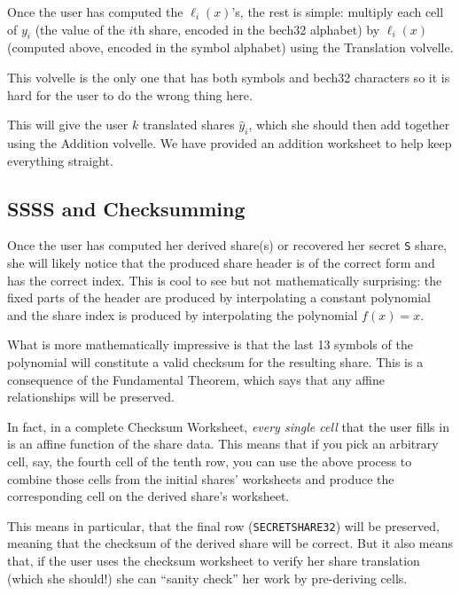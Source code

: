 \documentclass[letterpaper]{article}
\theoremstyle{xxx}
\theoremstyle{evil}
\theoremstyle{yyy}
\theoremstyle{plain}
\theoremstyle{zzz}
\newcommand{\vc}[1]{\texttt{#1}} %
\begin{document}
Once the user has computed the $\ell_i(x)$'s, the rest is simple: multiply each
cell of $y_i$ (the value of the $i$th share, encoded in the bech32 alphabet) by
$\ell_i(x)$ (computed above, encoded in the symbol alphabet) using the Translation
volvelle.

This volvelle is the only one that has both symbols and bech32 characters
so it is hard for the user to do the wrong thing here.

This will give the user $k$ translated shares $\hat{y}_i$, which she should then
add together using the Addition volvelle. We have provided an addition worksheet
to help keep everything straight.

\subsection{SSSS and Checksumming}

Once the user has computed her derived share(s) or recovered her secret \vc{S}
share, she will likely notice that the produced share header is of the correct form
and has the correct index. This is cool to see but not mathematically surprising:
the fixed parts of the header are produced by interpolating a constant polynomial
and the share index is produced by interpolating the polynomial $f(x) = x$.

What is more mathematically impressive is that the last 13 symbols of the polynomial
will constitute a valid checksum for the resulting share. This is a consequence of
the Fundamental Theorem, which says that any affine relationships will be preserved.

In fact, in a complete Checksum Worksheet, \emph{every single cell} that the user
fills in is an affine function of the share data. This means that if you pick an
arbitrary cell, say, the fourth cell of the tenth row, you can use the above process
to combine those cells from the initial shares' worksheets and produce the
corresponding cell on the derived share's worksheet.

This means in particular, that the final row (\vc{SECRETSHARE32}) will be
preserved, meaning that the checksum of the derived share will be correct. But it
also means that, if the user uses the checksum worksheet to verify her share
translation (which she should!) she can ``sanity check'' her work by pre-deriving
cells.
\end{document}
